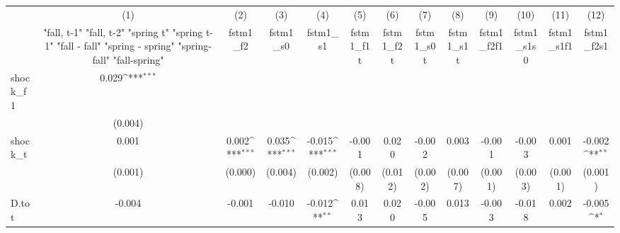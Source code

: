 {
\def\sym#1{\ifmmode^{#1}\else\(^{#1}\)\fi}
\begin{tabular}{l*{12}{c}}
\toprule
            &\multicolumn{1}{c}{(1)}&\multicolumn{1}{c}{(2)}&\multicolumn{1}{c}{(3)}&\multicolumn{1}{c}{(4)}&\multicolumn{1}{c}{(5)}&\multicolumn{1}{c}{(6)}&\multicolumn{1}{c}{(7)}&\multicolumn{1}{c}{(8)}&\multicolumn{1}{c}{(9)}&\multicolumn{1}{c}{(10)}&\multicolumn{1}{c}{(11)}&\multicolumn{1}{c}{(12)}\\
            &\multicolumn{1}{c}{  "fall, t-1" "fall, t-2" "spring t" "spring t-1"  "fall - fall" "spring - spring" "spring-fall" "fall-spring" }&\multicolumn{1}{c}{fstm1\_f2}&\multicolumn{1}{c}{fstm1\_s0}&\multicolumn{1}{c}{fstm1\_s1}&\multicolumn{1}{c}{fstm1\_f1t}&\multicolumn{1}{c}{fstm1\_f2t}&\multicolumn{1}{c}{fstm1\_s0t}&\multicolumn{1}{c}{fstm1\_s1t}&\multicolumn{1}{c}{fstm1\_f2f1}&\multicolumn{1}{c}{fstm1\_s1s0}&\multicolumn{1}{c}{fstm1\_s1f1}&\multicolumn{1}{c}{fstm1\_f2s1}\\
\midrule
shock\_f1    &       0.029\sym{***}&                     &                     &                     &                     &                     &                     &                     &                     &                     &                     &                     \\
            &     (0.004)         &                     &                     &                     &                     &                     &                     &                     &                     &                     &                     &                     \\
\addlinespace
shock\_t     &       0.001         &       0.002\sym{***}&       0.035\sym{***}&      -0.015\sym{***}&      -0.001         &       0.020         &      -0.002         &       0.003         &      -0.001         &      -0.003         &       0.001         &      -0.002\sym{**} \\
            &     (0.001)         &     (0.000)         &     (0.004)         &     (0.002)         &     (0.008)         &     (0.012)         &     (0.002)         &     (0.007)         &     (0.001)         &     (0.003)         &     (0.001)         &     (0.001)         \\
\addlinespace
D.tot       &      -0.004         &      -0.001         &      -0.010         &      -0.012\sym{**} &       0.013         &       0.020         &      -0.005         &       0.013         &      -0.003         &      -0.018         &       0.002         &      -0.005\sym{*}  \\

\end{tabular}}
